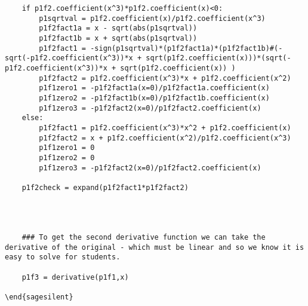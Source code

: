 \documentclass{ximera}
\begin{document}
\begin{verbatim}
    if p1f2.coefficient(x^3)*p1f2.coefficient(x)<0:
        p1sqrtval = p1f2.coefficient(x)/p1f2.coefficient(x^3)
        p1f2fact1a = x - sqrt(abs(p1sqrtval))
        p1f2fact1b = x + sqrt(abs(p1sqrtval))
        p1f2fact1 = -sign(p1sqrtval)*(p1f2fact1a)*(p1f2fact1b)#(-sqrt(-p1f2.coefficient(x^3))*x + sqrt(p1f2.coefficient(x)))*(sqrt(-p1f2.coefficient(x^3))*x + sqrt(p1f2.coefficient(x)) )
        p1f2fact2 = p1f2.coefficient(x^3)*x + p1f2.coefficient(x^2)
        p1f1zero1 = -p1f2fact1a(x=0)/p1f2fact1a.coefficient(x)
        p1f1zero2 = -p1f2fact1b(x=0)/p1f2fact1b.coefficient(x)
        p1f1zero3 = -p1f2fact2(x=0)/p1f2fact2.coefficient(x)
    else:
        p1f2fact1 = p1f2.coefficient(x^3)*x^2 + p1f2.coefficient(x)
        p1f2fact2 = x + p1f2.coefficient(x^2)/p1f2.coefficient(x^3)
        p1f1zero1 = 0
        p1f1zero2 = 0
        p1f1zero3 = -p1f2fact2(x=0)/p1f2fact2.coefficient(x)
    
    p1f2check = expand(p1f2fact1*p1f2fact2)
    
    
     
     
    ### To get the second derivative function we can take the derivative of the original - which must be linear and so we know it is easy to solve for students.
     
    p1f3 = derivative(p1f1,x)

\end{sagesilent}

\end{verbatim}
\end{document}
